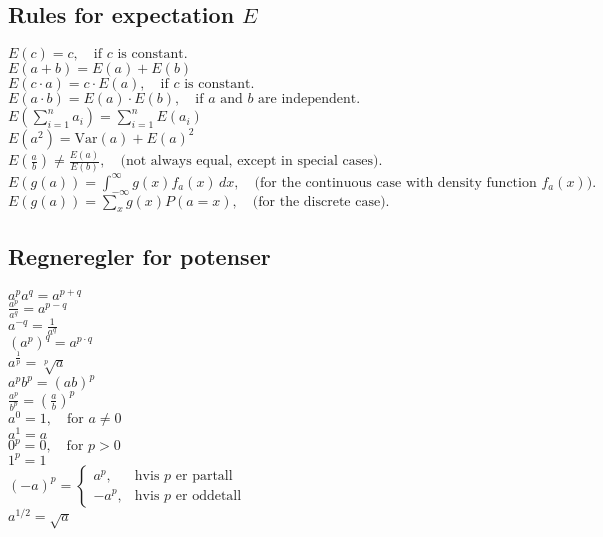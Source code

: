 \documentclass[a4paper,7pt,fleqn]{article}
\begin{document}
\begin{multicols}{3}
\begin{minipage}{\linewidth}
\subsection{Rules for expectation \(E\)} 
\(E(c) = c, \quad \text{if } c \text{ is constant.}\) \\
\(E(a + b) = E(a) + E(b)\) \\
\(E(c \cdot a) = c \cdot E(a), \quad \text{if } c \text{ is constant.}\) \\
\(E(a \cdot b) = E(a) \cdot E(b), \quad \text{if } a \text{ and } b \text{ are independent.}\) \\
\(E\left( \sum_{i=1}^n a_i \right) = \sum_{i=1}^n E(a_i)\) \\
\(E(a^2) = \text{Var}(a) + E(a)^2\) \\
\(E\left(\frac{a}{b}\right) \neq \frac{E(a)}{E(b)}, \quad \text{(not always equal, except in special cases).}\) \\
\(E(g(a)) = \int_{-\infty}^\infty g(x) f_a(x) \, dx, \quad \text{(for the continuous case with density function } f_a(x)\text{).}\) \\
\(E(g(a)) = \sum_{x} g(x) P(a = x), \quad \text{(for the discrete case).}\)
\end{minipage}

\begin{minipage}{\linewidth}
\subsection{Regneregler for potenser}
\(a^p a^q = a^{p+q}\) \\
\(\frac{a^p}{a^q} = a^{p-q}\) \\
\(a^{-q} = \frac{1}{a^q}\) \\
\((a^p)^q = a^{p \cdot q}\) \\
\(a^{\frac{1}{p}} = \sqrt[p]{a}\) \\
\(a^p b^p = (ab)^p\) \\
\(\frac{a^p}{b^p} = \left(\frac{a}{b}\right)^p\) \\
\(a^0 = 1, \quad \text{for } a \neq 0\) \\
\(a^1 = a\) \\
\(0^p = 0, \quad \text{for } p > 0\) \\
\(1^p = 1\) \\
\((-a)^p = 
\begin{cases} 
    a^p, & \text{hvis } p \text{ er partall} \\
    -a^p, & \text{hvis } p \text{ er oddetall} 
\end{cases}\) \\
\(a^{1/2} = \sqrt{a}\)
\end{minipage}


\end{multicols}
\end{document}

